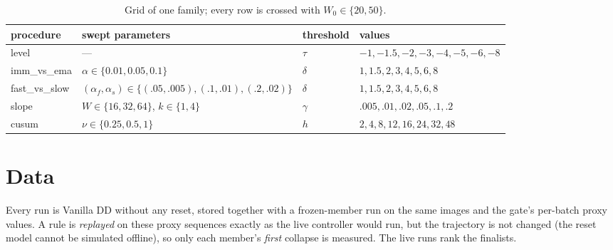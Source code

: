 \documentclass[10pt]{article}
\begin{document}
\begin{table}[ht]
  \centering\small
  \caption{Grid of one family; every row is crossed with $W_0 \in \{20, 50\}$.}
  \label{tab:grid}
  \begin{tabular}{@{}l p{6.2cm} l l@{}}
    \toprule
    procedure & swept parameters & threshold & values \\
    \midrule
    level        & ---                                            & $\tau$   & $-1, -1.5, -2, -3, -4, -5, -6, -8$ \\
    imm\_vs\_ema & $\alpha \in \{0.01, 0.05, 0.1\}$               & $\delta$ & $1, 1.5, 2, 3, 4, 5, 6, 8$ \\
    fast\_vs\_slow & $(\alpha_f, \alpha_s) \in \{(.05,.005), (.1,.01), (.2,.02)\}$ & $\delta$ & $1, 1.5, 2, 3, 4, 5, 6, 8$ \\
    slope        & $W \in \{16, 32, 64\}$, $k \in \{1, 4\}$       & $\gamma$ & $.005, .01, .02, .05, .1, .2$ \\
    cusum        & $\nu \in \{0.25, 0.5, 1\}$                     & $h$      & $2, 4, 8, 12, 16, 24, 32, 48$ \\
    \bottomrule
  \end{tabular}
\end{table}

\section{Data}
Every run is Vanilla DD without any reset, stored together with a frozen-member run on the same images and the gate's per-batch proxy values. A rule is \emph{replayed} on these proxy sequences exactly as the live controller would run, but the trajectory is not changed (the reset model cannot be simulated offline), so only each member's \emph{first} collapse is measured. The live runs rank the finalists.
\end{document}
